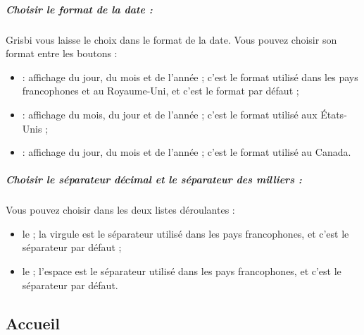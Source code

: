 \subparagraph{Choisir le format de la date :}\label{setup-general-localisation-date}

Grisbi vous laisse le choix dans le format de la date. Vous pouvez choisir son format entre les boutons :
\begin{itemize}
	\item {} : affichage du jour, du mois et de l'année ; c'est le format utilisé dans les pays francophones et au Royaume-Uni, et c'est le format par défaut ;    
	\item {} : affichage du mois, du jour et de l'année ; c'est le format utilisé aux États-Unis ;
	\item {} : affichage du jour, du mois et de l'année ; c'est le format utilisé au Canada.
\end{itemize}





\subparagraph{Choisir le séparateur décimal et le séparateur des milliers :}

Vous pouvez choisir dans les deux listes déroulantes :
\begin{itemize}
	\item le  ; la virgule est le séparateur utilisé dans les pays francophones, et c'est le séparateur par défaut ;    
	\item le  ; l'espace est le séparateur utilisé dans les pays francophones, et c'est le séparateur par défaut.
\end{itemize}


\subsection{Accueil\label{setup-general-home}}

